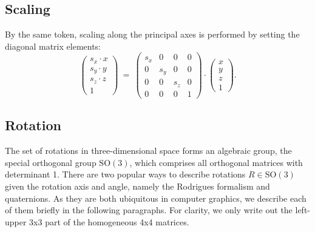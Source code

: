 \subsection{Scaling}
By the same token, scaling along the principal axes is performed by setting the diagonal matrix elements:
\begin{equation}
	\left( \begin{array}{c} s_x \cdot x \\ s_y \cdot y \\ s_z \cdot z \\ 1 \end{array} \right) 
	\ =\  
	\left( \begin{array}{cccc} 
		s_x & 0 & 0 & 0 \\
		0 & s_y & 0 & 0 \\
		0 & 0 & s_z & 0 \\
		0 & 0 & 0 & 1
	\end{array} \right) \cdot
	\left( \begin{array}{c} x \\ y \\ z \\ 1 \end{array} \right).
\end{equation}


\subsection{Rotation}
The set of rotations in three-dimensional space forms an algebraic group, the special orthogonal group $\mathrm{SO\left(3\right)}$,
which comprises all orthogonal matrices with determinant 1.
There are two popular ways to describe rotations $R \in \mathrm{SO\left(3\right)}$ given the rotation axis and angle, 
namely the Rodrigues formalism and quaternions. 
As they are both ubiquitous in computer graphics, we describe each of them briefly in the following paragraphs.
For clarity, we only write out the left-upper 3x3 part of the homogeneous 4x4 matrices.


